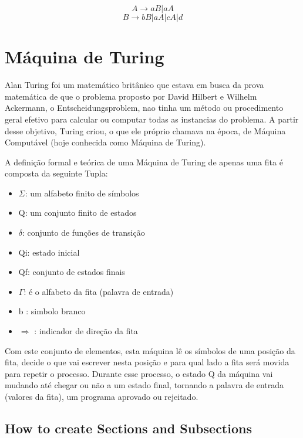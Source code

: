 \documentclass{article}
\begin{document}
                                                 \[A \longrightarrow aB | aA\] 
                                                \[B \longrightarrow bB | aA | cA | d\]
                     
    
    
    
    

\section{Máquina de Turing }
    Alan Turing foi um matemático britânico que estava em busca da prova matemática de que o problema proposto por David Hilbert e Wilhelm Ackermann, o Entscheidungsproblem, nao tinha um método ou procedimento geral efetivo para calcular ou computar todas as instancias do problema. 
    A partir desse objetivo, Turing criou, o que ele próprio chamava na época, de Máquina Computável (hoje conhecida como Máquina de Turing).
    
    A definição formal e teórica de uma Máquina de Turing de apenas uma fita é composta da seguinte Tupla:
    
    \begin{itemize}
        \item $\Sigma$: um alfabeto finito de símbolos
        \item Q: um conjunto finito de estados
        \item $\delta$: conjunto de funções de transição 
        \item Qi: estado inicial
        \item Qf: conjunto de estados finais
        \item $\Gamma$: é o alfabeto da fita (palavra de entrada)
        \item b : simbolo branco
        \item ${\Longrightarrow}$ : indicador de direção da fita
\end{itemize}

        
    Com este conjunto de elementos, esta máquina lê os símbolos de uma posição da fita, decide o que vai escrever nesta posição e para qual lado a fita será movida para repetir o processo. Durante esse processo, o estado Q da máquina vai mudando até chegar ou não a um estado final, tornando a palavra de entrada (valores da fita), um programa aprovado ou rejeitado.

\subsection{How to create Sections and Subsections}
\end{document}
